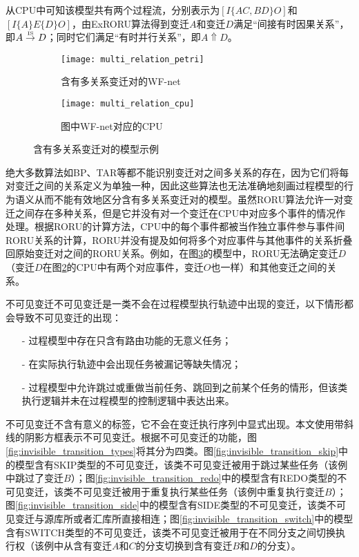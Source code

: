 从CPU中可知该模型共有两个过程流，分别表示为$[I\{AC,BD\}O]$和$[I\{A\}E\{D\}O]$，由ExRORU算法得到变迁$A$和变迁$D$满足“间接有时因果关系”，即$A\overset{\text{\tiny{IS}}}{\rightarrow}D$；同时它们满足“有时并行关系”，即$A\Uparrow D$。

\begin{figure}[htbp]
  \centering
  \begin{subfigure}{1\textwidth}
    \centering
    \texttt{[image: multi\_relation\_petri]}
    \caption{含有多关系变迁对的WF-net}
    \label{fig:multi_relation_petri}
  \end{subfigure}
  \begin{subfigure}{1\textwidth}
    \vspace{1em}
    \centering
    \texttt{[image: multi\_relation\_cpu]}
    \caption{图中WF-net对应的CPU}
    \label{fig:multi_relation_cpu}
  \end{subfigure}
  \caption{含有多关系变迁对的模型示例}
  \label{fig:multi_relation}
\end{figure}

绝大多数算法如BP、TAR等都不能识别变迁对之间多关系的存在，因为它们将每对变迁之间的关系定义为单独一种，因此这些算法也无法准确地刻画过程模型的行为语义从而不能有效地区分含有多关系变迁对的模型。虽然RORU算法允许一对变迁之间存在多种关系，但是它并没有对一个变迁在CPU中对应多个事件的情况作处理。根据RORU的计算方法，CPU中的每个事件都被当作独立事件参与事件间RORU关系的计算，RORU并没有提及如何将多个对应事件与其他事件的关系折叠回原始变迁对之间的RORU关系。例如，在图\ref{fig:multi_relation}的模型中，RORU无法确定变迁$D$（变迁$D$在图\ref{fig:multi_relation_cpu}的CPU中有两个对应事件，变迁$O$也一样）和其他变迁之间的关系。

{\heiti 不可见变迁\qquad}不可见变迁是一类不会在过程模型执行轨迹中出现的变迁，以下情形都会导致不可见变迁的出现：
\begin{itemize}
  \item[-] 过程模型中存在只含有路由功能的无意义任务；
  \item[-] 在实际执行轨迹中会出现任务被漏记等缺失情况；
  \item[-] 过程模型中允许跳过或重做当前任务、跳回到之前某个任务的情形，但该类执行逻辑并未在过程模型的控制逻辑中表达出来。
\end{itemize}
不可见变迁不含有意义的标签，它不会在变迁执行序列中显式出现。本文使用带斜线的阴影方框表示不可见变迁。根据不可见变迁的功能，图\ref{fig:invisible_transition_types}将其分为四类。图\ref{fig:invisible_transition_skip}中的模型含有SKIP类型的不可见变迁，该类不可见变迁被用于跳过某些任务（该例中跳过了变迁$B$）；图\ref{fig:invisible_transition_redo}中的模型含有REDO类型的不可见变迁，该类不可见变迁被用于重复执行某些任务（该例中重复执行变迁$B$）；图\ref{fig:invisible_transition_side}中的模型含有SIDE类型的不可见变迁，该类不可见变迁与源库所或者汇库所直接相连；图\ref{fig:invisible_transition_switch}中的模型含有SWITCH类型的不可见变迁，该类不可见变迁被用于在不同分支之间切换执行权（该例中从含有变迁$A$和$C$的分支切换到含有变迁$B$和$D$的分支）。

